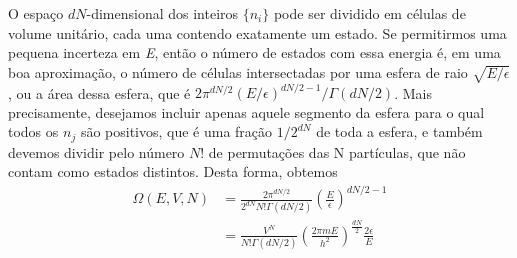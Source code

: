 \documentclass[12pt]{article}
\begin{document}
O espaço $dN$-dimensional dos inteiros $\{n_i\}$ pode ser dividido em células de volume unitário, cada uma contendo exatamente um estado. Se permitirmos uma pequena incerteza em \textit{E}, então o número de estados com essa energia é, em uma boa aproximação, o número de células intersectadas por uma esfera de raio \(\sqrt{E/\epsilon}\), ou a área dessa esfera, que é $2\pi^{dN/2} (E/\epsilon)^{dN/2-1} / \Gamma(dN/2)$. Mais precisamente, desejamos incluir apenas aquele segmento da esfera para o qual todos os $n_j$ são positivos, que é uma fração $1/2^{dN}$ de toda a esfera, e também devemos dividir pelo número $N!$ de permutações das N partículas, que não contam como estados distintos. Desta forma, obtemos
\[
\begin{aligned}
\Omega(E, V, N) &= \frac{2 \pi^{dN/2}}{2^{dN} N! \Gamma(dN/2)} \left( \frac{E}{\epsilon} \right)^{dN/2 - 1} \\
&= \frac{V^N}{N! \Gamma(dN/2)} \left( \frac{2 \pi m E}{h^2} \right)^{\frac{dN}{2}} \frac{2 \epsilon}{E}
\end{aligned}
\]
\end{document}
